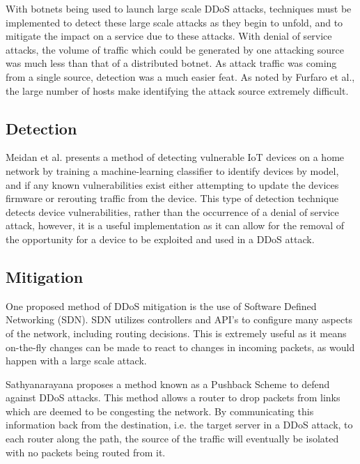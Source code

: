 With botnets being used to launch large scale DDoS attacks, techniques must be
implemented to detect these large scale attacks as they begin to unfold, and to
mitigate the impact on a service due to these attacks. With denial of service
attacks, the volume of traffic which could be generated by one attacking source
was much less than that of a distributed botnet. As attack traffic was coming
from a single source, detection was a much easier feat. As noted by Furfaro et
al.\cite{furfaro}, the large number of hosts make identifying the attack source
extremely difficult.

\subsection{Detection}

Meidan et al.\cite{meidan} presents a method of detecting vulnerable IoT devices on a
home network by training a machine-learning classifier to identify devices by
model, and if any known vulnerabilities exist either attempting to update the
devices firmware or rerouting traffic from the device. This type of detection
technique detects device vulnerabilities, rather than the occurrence of a denial
of service attack, however, it is a useful implementation as it can allow for
the removal of the opportunity for a device to be exploited and used in a DDoS
attack.

\subsection{Mitigation}

One proposed method of DDoS mitigation is the use of Software Defined Networking
(SDN). SDN utilizes controllers and API's to configure many aspects of the
network, including routing decisions. This is extremely useful as it means
on-the-fly changes can be made to react to changes in incoming packets, as would
happen with a large scale attack.

Sathyanarayana\cite{sdn} proposes a method known as a Pushback Scheme to defend
against DDoS attacks. This method allows a router to drop packets from links
which are deemed to be congesting the network. By communicating this information
back from the destination, i.e. the target server in a DDoS attack, to each
router along the path, the source of the traffic will eventually be isolated
with no packets being routed from it.
